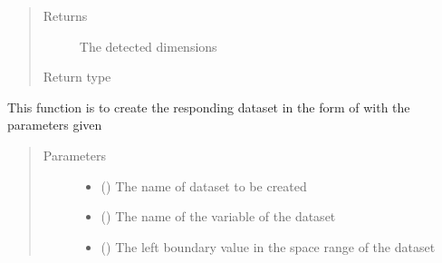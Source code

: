 \documentclass[letterpaper,10pt,english]{sphinxmanual}
\begin{document}
\begin{fulllineitems}
\begin{fulllineitems}
\begin{quote}
\begin{description}
\begin{itemize}
\end{itemize}

\item[{Returns}] \leavevmode
The detected dimensions

\item[{Return type}] \leavevmode
{}

\end{description}\end{quote}

\end{fulllineitems}


\begin{fulllineitems}
\label{\detokenize{AgentTools.util:AgentTools.util.OutputUtil.OutputUtil.create_dataset}}
This function is to create the responding dataset in the form of  with the parameters given
\begin{quote}\begin{description}
\item[{Parameters}] \leavevmode\begin{itemize}
\item {} 
 () \textendash{} The name of dataset to be created

\item {} 
 () \textendash{} The name of the variable of the dataset

\item {} 
 () \textendash{} The left boundary value in the space range of the dataset


\end{itemize}
\end{description}
\end{quote}
\end{fulllineitems}
\end{fulllineitems}
\end{document}
